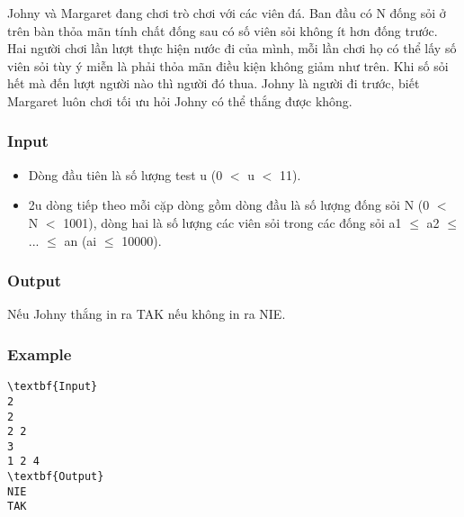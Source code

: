 







   Johny và Margaret đang chơi trò chơi với các viên đá. Ban đầu có N đống sỏi ở trên bàn thỏa mãn tính chất đống sau có số viên sỏi không ít hơn đống trước. Hai người chơi lần lượt thực hiện nước đi của mình, mỗi lần chơi họ có thể lấy số viên sỏi tùy ý miễn là phải thỏa mãn điều kiện không giảm như trên. Khi số sỏi hết mà đến lượt người nào thì người đó thua. Johny là người đi trước, biết Margaret luôn chơi tối ưu hỏi Johny có thể thắng được không.  

\subsubsection{   Input  }
\begin{itemize}
	\item     Dòng đầu tiên là số lượng test u (0 $<$ u $<$ 11).   
	\item     2u dòng tiếp theo mỗi cặp dòng gồm dòng đầu là số lượng đống sỏi N (0 $<$ N $<$ 1001), dòng hai là số lượng các viên sỏi trong các đống sỏi a1  $\le$  a2  $\le$  ...  $\le$  an (ai  $\le$  10000).   
\end{itemize}

\subsubsection{   Output  }

   Nếu Johny thắng in ra TAK nếu không in ra NIE.  

\subsubsection{   Example  }
\begin{verbatim}
\textbf{Input} 
2
2
2 2
3
1 2 4
\textbf{Output} 
NIE
TAK
\end{verbatim}

